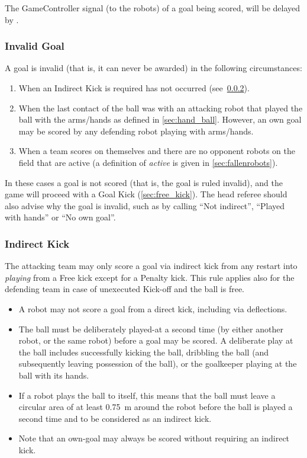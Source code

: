 The GameController signal (to the robots) of a goal being scored, will be delayed by \GoalScoredDelay.

\subsubsection{Invalid Goal}
\label{sec:invalid_goal}

A goal is invalid (that is, it can never be awarded) in the following circumstances:
\begin{enumerate}
    \item When an Indirect Kick is required has not occurred (see~\cref{sec:indirect_kick}).
    \item When the last contact of the ball was with an attacking robot that played the ball with the arms/hands as defined in \cref{sec:hand_ball}. However, an own goal may be scored by any defending robot playing with arms/hands.
    \item When a team scores on themselves and there are no opponent robots on the field that are active (a definition of \emph{active} is given in \cref{sec:fallenrobots}).
\end{enumerate}

In these cases a goal is not scored (that is, the goal is ruled invalid), and the game will proceed with a Goal Kick (\cf \cref{sec:free_kick}). The head referee should also advise why the goal is invalid, such as by calling ``Not indirect'', ``Played with hands'' or ``No own goal''.

\subsubsection{Indirect Kick}
\label{sec:indirect_kick}

The attacking team may only score a goal via indirect kick from any restart into \textit{playing} from a Free kick except for a Penalty kick. This rule applies also for the defending team in case of unexecuted Kick-off and the ball is free. 

\begin{itemize}
  \item A robot may not score a goal from a direct kick, including via deflections.
  \item The ball must be deliberately played-at a second time (by either another robot, or the same robot) before a goal may be scored. A deliberate play at the ball includes successfully kicking the ball, dribbling the ball (and subsequently leaving possession of the ball), or the goalkeeper playing at the ball with its hands.
  \item If a robot plays the ball to itself, this means that the ball must leave a circular area of at least \qty{0.75}{\metre} around the robot before the ball is played a second time and to be considered as an indirect kick.
  \item Note that an own-goal may always be scored without requiring an indirect kick.
\end{itemize}

